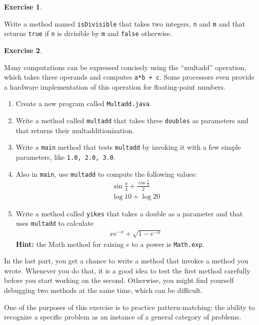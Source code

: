 \documentclass[12pt]{book}
\def\HINT{\textbf{Hint:}}
\theoremstyle{definition}
\newtheorem{excz}{Exercise}[chapter]
\newenvironment{exercise}{\bigskip\begin{excz}\mbox{}}{\end{excz}}
\begin{document}
\begin{exercise}
\label{ex.isdiv}

Write a method named {\tt isDivisible} that takes
two integers, {\tt n} and {\tt m} and that returns {\tt true}
if {\tt n} is divisible by {\tt m} and {\tt false} otherwise.

\end{exercise}


\begin{exercise}
\label{ex.multadd}

Many computations can be expressed concisely using the ``multadd''
operation, which takes three operands and computes {\tt a*b + c}.  Some
processors even provide a hardware implementation of this operation for
floating-point numbers.

\begin{enumerate}

\item Create a new program called {\tt Multadd.java}.

\item Write a method called {\tt multadd} that takes three {\tt doubles}
as parameters and that returns their multadditionization.

\item Write a {\tt main} method that tests {\tt multadd} by invoking it with a
few simple parameters, like {\tt 1.0, 2.0, 3.0}.

\item Also in {\tt main}, use {\tt multadd} to compute the
following values:
%
\begin{eqnarray*}
& \sin \frac{\pi}{4} + \frac{\cos \frac{\pi}{4}}{2} & \\
& \log 10 + \log 20 &
\end{eqnarray*}
%
\item Write a method called {\tt yikes} that takes a
double as a parameter and that uses {\tt multadd} to calculate
%
\begin{eqnarray*}
x e^{-x} + \sqrt{1 - e^{-x}}
\end{eqnarray*}
%
\HINT{} the Math method for raising $e$ to a power is {\tt Math.exp}.

\end{enumerate}

In the last part, you get a chance to write a method that invokes
a method you wrote.  Whenever you do that, it is a good idea to
test the first method carefully before you start working on the
second.  Otherwise, you might find yourself debugging two methods
at the same time, which can be difficult.

One of the purposes of this exercise is to practice pattern-matching:
the ability to recognize a specific problem as an instance of a
general category of problems.

\end{exercise}
\end{document}
